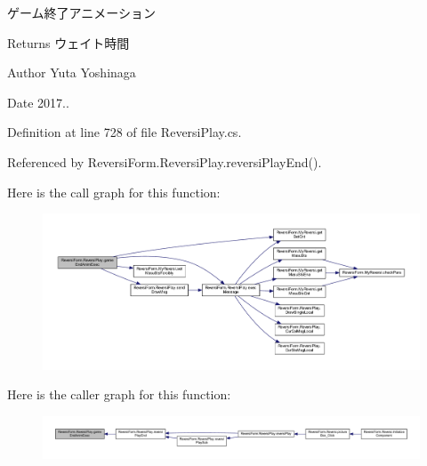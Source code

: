 ゲーム終了アニメーション 

\begin{DoxyReturn}{Returns}
ウェイト時間 
\end{DoxyReturn}
\begin{DoxyAuthor}{Author}
Yuta Yoshinaga 
\end{DoxyAuthor}
\begin{DoxyDate}{Date}
2017.. 
\end{DoxyDate}


Definition at line 728 of file Reversi\+Play.\+cs.



Referenced by Reversi\+Form.\+Reversi\+Play.\+reversi\+Play\+End().

Here is the call graph for this function\+:
\nopagebreak
\begin{figure}[H]
\begin{center}
\leavevmode
\includegraphics[width=350pt]{class_reversi_form_1_1_reversi_play_aec95b109a53b3cdab6466a4fca52f967_cgraph}
\end{center}
\end{figure}
Here is the caller graph for this function\+:
\nopagebreak
\begin{figure}[H]
\begin{center}
\leavevmode
\includegraphics[width=350pt]{class_reversi_form_1_1_reversi_play_aec95b109a53b3cdab6466a4fca52f967_icgraph}
\end{center}
\end{figure}
\mbox{\label{class_reversi_form_1_1_reversi_play_a03997d634aa21a84e660e7f98aa27064}} 
